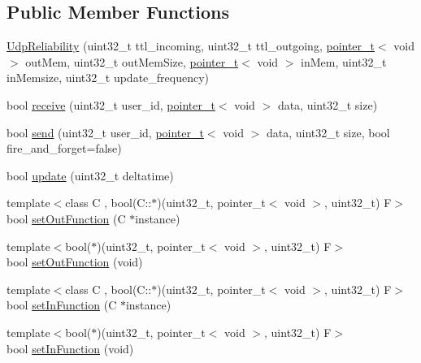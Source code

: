 \subsection*{Public Member Functions}
\begin{DoxyCompactItemize}
\item 
\hyperlink{classcrap_1_1_udp_reliability_aee71353a45b3fe47dca9a8ed738364c8}{Udp\+Reliability} (uint32\+\_\+t ttl\+\_\+incoming, uint32\+\_\+t ttl\+\_\+outgoing, \hyperlink{structcrap_1_1pointer__t}{pointer\+\_\+t}$<$ void $>$ out\+Mem, uint32\+\_\+t out\+Mem\+Size, \hyperlink{structcrap_1_1pointer__t}{pointer\+\_\+t}$<$ void $>$ in\+Mem, uint32\+\_\+t in\+Memsize, uint32\+\_\+t update\+\_\+frequency)
\item 
bool \hyperlink{classcrap_1_1_udp_reliability_aeb79c0f4b500c79d8eeb572a230fb19d}{receive} (uint32\+\_\+t user\+\_\+id, \hyperlink{structcrap_1_1pointer__t}{pointer\+\_\+t}$<$ void $>$ data, uint32\+\_\+t size)
\item 
bool \hyperlink{classcrap_1_1_udp_reliability_a6f3146082783aa6ceebe4b5e3982dec6}{send} (uint32\+\_\+t user\+\_\+id, \hyperlink{structcrap_1_1pointer__t}{pointer\+\_\+t}$<$ void $>$ data, uint32\+\_\+t size, bool fire\+\_\+and\+\_\+forget=false)
\item 
bool \hyperlink{classcrap_1_1_udp_reliability_ae4004c16b0b1dc5dcfffeb8af065e485}{update} (uint32\+\_\+t deltatime)
\item 
{\footnotesize template$<$class C , bool(\+C\+::$\ast$)(uint32\+\_\+t, pointer\+\_\+t$<$ void $>$, uint32\+\_\+t) F$>$ }\\bool \hyperlink{classcrap_1_1_udp_reliability_a7ccf18df23d9e8c7d530d0c6f9068a48}{set\+Out\+Function} (C $\ast$instance)
\item 
{\footnotesize template$<$bool($\ast$)(uint32\+\_\+t, pointer\+\_\+t$<$ void $>$, uint32\+\_\+t) F$>$ }\\bool \hyperlink{classcrap_1_1_udp_reliability_aa9fe79b988d87ffb514a10731e8b6fd9}{set\+Out\+Function} (void)
\item 
{\footnotesize template$<$class C , bool(\+C\+::$\ast$)(uint32\+\_\+t, pointer\+\_\+t$<$ void $>$, uint32\+\_\+t) F$>$ }\\bool \hyperlink{classcrap_1_1_udp_reliability_ab0f4508e8b041ddf72d0e27a4f2c8bac}{set\+In\+Function} (C $\ast$instance)
\item 
{\footnotesize template$<$bool($\ast$)(uint32\+\_\+t, pointer\+\_\+t$<$ void $>$, uint32\+\_\+t) F$>$ }\\bool \hyperlink{classcrap_1_1_udp_reliability_aba3f02d1e01530f1aaa9d2a8899f9133}{set\+In\+Function} (void)

\end{DoxyCompactItemize}
